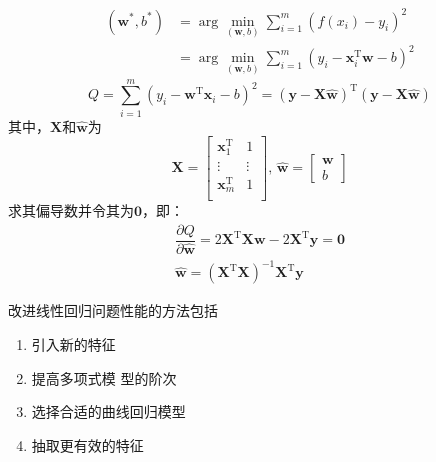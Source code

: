 \[
    \begin{array}{ll}
        (\boldsymbol{w}^{*},b^{*}) &= \arg\min\limits_{(\boldsymbol{w},b)}\sum_{i = 1}^{m}\left( f(x_i)-y_i \right)^2\\
        &= \arg\min\limits_{(\boldsymbol{w},b)}\sum_{i = 1}^{m}\left( y_i - \boldsymbol{x}_i^{\mathrm{T}}\boldsymbol{w} - b \right)^2
    \end{array}
\]
\[
    Q = \sum_{i = 1}^{m}\left( y_i - \boldsymbol{w}^{\mathrm{T}}\boldsymbol{x}_i - b \right)^2 = (\boldsymbol{y}-\boldsymbol{X}\hat{\boldsymbol{w}})^{\mathrm{T}} (\boldsymbol{y}-\boldsymbol{X}\hat{\boldsymbol{w}})
\]
其中，$\boldsymbol{X}$和$\hat{\boldsymbol{w}}$为
\[
    \boldsymbol{X} = \begin{bmatrix}
        \boldsymbol{x}_1^{\mathrm{T}} & 1\\
        \vdots & \vdots \\
        \boldsymbol{x}_m^{\mathrm{T}} & 1\\
    \end{bmatrix},\,
    \hat{\boldsymbol{w}} = \begin{bmatrix}
        \boldsymbol{w}\\
        b
    \end{bmatrix} 
\]
求其偏导数并令其为$\boldsymbol{0}$，即：
\[
    \begin{array}{c}
        \dfrac{\partial Q}{\partial \hat{\boldsymbol{w}}} = 2\boldsymbol{X}^{\mathrm{T}}\boldsymbol{Xw}-2\boldsymbol{X}^{\mathrm{T}}\boldsymbol{y} = \boldsymbol{0}\\
        \hat{\boldsymbol{w}} = \left( \boldsymbol{X}^{\mathrm{T}}\boldsymbol{X} \right)^{-1}\boldsymbol{X}^{\mathrm{T}}\boldsymbol{y}
    \end{array}
\]

\begin{example}
    \textcolor{main1}{改进线性回归问题性能的方法包括}
    \begin{enumerate}[A]
        \item \textcolor{main1}{引入新的特征}
        \item \textcolor{main1}{提高多项式模
        型的阶次}
        \item \textcolor{main1}{选择合适的曲线回归模型}
        \item \textcolor{main1}{抽取更有效的特征}
    \end{enumerate}
\end{example}

